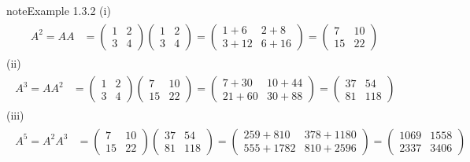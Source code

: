 \documentclass[letterpaper,10pt,english]{jupyterBook}
\begin{document}
\begin{sphinxadmonition}{note}{Example 1.3.2}
\sphinxAtStartPar
(i)
\begin{equation*}
\begin{split} \begin{align*}
    A^2 = AA &= \begin{pmatrix} 1 & 2 \\ 3 & 4 \end{pmatrix}
    \begin{pmatrix} 1 & 2 \\ 3 & 4 \end{pmatrix}
    = \begin{pmatrix} 1 + 6 & 2 + 8 \\ 3 + 12 & 6 + 16 \end{pmatrix}
    = \begin{pmatrix} 7 & 10 \\ 15 & 22 \end{pmatrix}
\end{align*} \end{split}
\end{equation*}
\sphinxAtStartPar
(ii)
\begin{equation*}
\begin{split} \begin{align*}
    A^3 = AA^2 &=
    \begin{pmatrix} 1 & 2 \\ 3 & 4 \end{pmatrix}
    \begin{pmatrix} 7 & 10 \\ 15 & 22 \end{pmatrix}
    = \begin{pmatrix} 7 + 30 & 10 + 44 \\ 21 + 60 & 30 + 88 \end{pmatrix}
    = \begin{pmatrix} 37 & 54 \\ 81 & 118 \end{pmatrix}
\end{align*} \end{split}
\end{equation*}
\sphinxAtStartPar
(iii)
\begin{equation*}
\begin{split} \begin{align*}
    A^5 = A^2A^3 &=
    \begin{pmatrix} 7 & 10 \\ 15 & 22 \end{pmatrix}
    \begin{pmatrix} 37 & 54 \\ 81 & 118 \end{pmatrix}
    = \begin{pmatrix} 259 + 810 & 378 + 1180 \\ 555 + 1782 & 810 + 2596 \end{pmatrix}
    = \begin{pmatrix} 1069 & 1558 \\ 2337 & 3406 \end{pmatrix}
\end{align*} \end{split}
\end{equation*}\end{sphinxadmonition}
\end{document}
